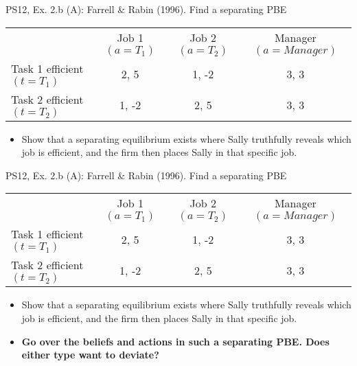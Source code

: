 \begin{frame}{PS12, Ex. 2.b (A): Farrell \& Rabin (1996). Find a separating PBE}
    \begin{table}
      \begin{tabular}{l|c|c|c|}
          \multicolumn{1}{c}{} & \multicolumn{1}{c}{Job 1 $(a=T_1)$} & \multicolumn{1}{c}{Job 2 $(a=T_2)$} & \multicolumn{1}{c}{Manager $(a=Manager)$} \\\cline{2-4}
           Task 1 efficient $(t=T_1)$ & 2, 5 & 1, -2 & 3, 3 \\\cline{2-4}
           Task 2 efficient $(t=T_2)$ & 1, -2 & 2, 5 & 3, 3 \\\cline{2-4}
      \end{tabular}
    \end{table}\vspace{-12pt}
    \begin{itemize}
      \item[(b)] Show that a separating equilibrium exists where Sally truthfully reveals which job is efficient, and the firm then places Sally in that specific job.
    \end{itemize}\vspace{-6pt}
    \vfill\null
\end{frame}
\begin{frame}{PS12, Ex. 2.b (A): Farrell \& Rabin (1996). Find a separating PBE}
    \begin{table}
      \begin{tabular}{l|c|c|c|}
          \multicolumn{1}{c}{} & \multicolumn{1}{c}{Job 1 $(a=T_1)$} & \multicolumn{1}{c}{Job 2 $(a=T_2)$} & \multicolumn{1}{c}{Manager $(a=Manager)$} \\\cline{2-4}
           Task 1 efficient $(t=T_1)$ & 2, 5 & 1, -2 & 3, 3 \\\cline{2-4}
           Task 2 efficient $(t=T_2)$ & 1, -2 & 2, 5 & 3, 3 \\\cline{2-4}
      \end{tabular}
    \end{table}\vspace{-12pt}
    \begin{itemize}
      \item[(b)] Show that a separating equilibrium exists where Sally truthfully reveals which job is efficient, and the firm then places Sally in that specific job.
      \item[Step 1:] \textbf{Go over the beliefs and actions in such a separating PBE. Does either type want to deviate?}
    \end{itemize}
    \vfill\null
\end{frame}
